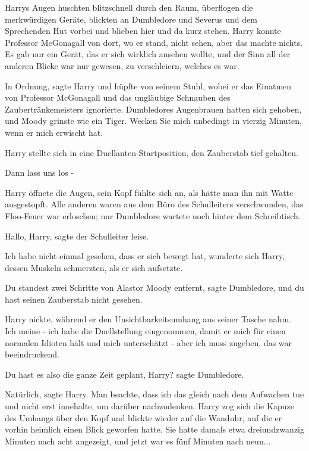 Harrys Augen huschten blitzschnell durch den Raum, überflogen die merkwürdigen
Geräte, blickten an Dumbledore und Severus und dem Sprechenden Hut vorbei und
blieben hier und da kurz stehen. Harry konnte Professor McGonagall von dort, wo
er stand, nicht sehen, aber das machte nichts. Es gab nur ein Gerät, das er sich
wirklich ansehen wollte, und der Sinn all der anderen Blicke war nur gewesen, zu
verschleiern, welches es war.

\glqq{}In Ordnung\grqq{}, sagte Harry und hüpfte von seinem Stuhl, wobei er das
Einatmen von Professor McGonagall und das ungläubige Schnauben des
Zaubertränkemeisters ignorierte. Dumbledores Augenbrauen hatten sich gehoben,
und Moody grinste wie ein Tiger. \glqq{}Wecken Sie mich unbedingt in vierzig
Minuten, wenn er mich erwischt hat.\grqq{}

Harry stellte sich in eine Duellanten-Startposition, den Zauberstab tief
gehalten.

\glqq{}Dann lass uns los -\grqq{}

Harry öffnete die Augen, sein Kopf fühlte sich an, als hätte man ihn mit Watte
ausgestopft. Alle anderen waren aus dem Büro des Schulleiters verschwunden, das
Floo-Feuer war erloschen; nur Dumbledore wartete noch hinter dem Schreibtisch.

\glqq{}Hallo, Harry\grqq{}, sagte der Schulleiter leise.

\glqq{}Ich habe nicht einmal gesehen, dass er sich bewegt hat\grqq{}, wunderte
sich Harry, dessen Muskeln schmerzten, als er sich aufsetzte.

\glqq{}Du standest zwei Schritte von Alastor Moody entfernt\grqq{}, sagte
Dumbledore, \glqq{}und du hast seinen Zauberstab nicht gesehen.\grqq{}

Harry nickte, während er den Unsichtbarkeitsumhang aus seiner Tasche nahm. \glqq{}
Ich meine - ich habe die Duellstellung eingenommen, damit er mich für einen
normalen Idioten hält und mich unterschätzt - aber ich muss zugeben, das war
beeindruckend.\grqq{}

\glqq{}Du hast es also die ganze Zeit geplant, Harry?\grqq{} sagte Dumbledore.

\glqq{}Natürlich\grqq{}, sagte Harry. \glqq{}Man beachte, dass ich das gleich nach
dem Aufwachen tue und nicht erst innehalte, um darüber nachzudenken.\grqq{}
Harry zog sich die Kapuze des Umhangs über den Kopf und blickte wieder auf die
Wanduhr, auf die er vorhin heimlich einen Blick geworfen hatte. Sie hatte damals
etwa dreiundzwanzig Minuten nach acht angezeigt, und jetzt war es fünf Minuten
nach neun...

